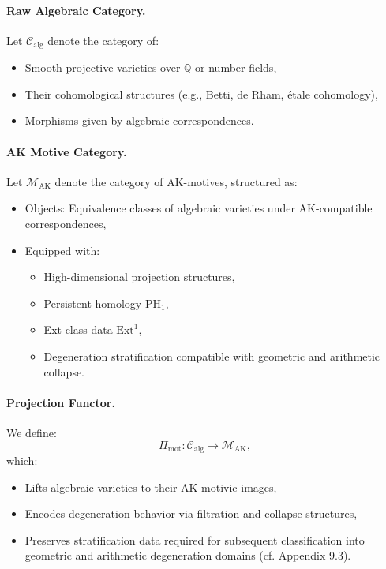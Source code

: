 \documentclass[11pt]{article}
\begin{document}
\paragraph{Raw Algebraic Category.}
Let \( \mathcal{C}_{\mathrm{alg}} \) denote the category of:
\begin{itemize}
  \item Smooth projective varieties over \( \mathbb{Q} \) or number fields,
  \item Their cohomological structures (e.g., Betti, de Rham, étale cohomology),
  \item Morphisms given by algebraic correspondences.
\end{itemize}

\paragraph{AK Motive Category.}
Let \( \mathcal{M}_{\mathrm{AK}} \) denote the category of AK-motives, structured as:
\begin{itemize}
  \item Objects: Equivalence classes of algebraic varieties under AK-compatible correspondences,
  \item Equipped with:
  \begin{itemize}
    \item High-dimensional projection structures,
    \item Persistent homology \( \mathrm{PH}_1 \),
    \item Ext-class data \( \mathrm{Ext}^1 \),
    \item Degeneration stratification compatible with geometric and arithmetic collapse.
  \end{itemize}
\end{itemize}

\paragraph{Projection Functor.}
We define:
\[
\Pi_{\mathrm{mot}} : \mathcal{C}_{\mathrm{alg}} \longrightarrow \mathcal{M}_{\mathrm{AK}},
\]
which:
\begin{itemize}
  \item Lifts algebraic varieties to their AK-motivic images,
  \item Encodes degeneration behavior via filtration and collapse structures,
  \item Preserves stratification data required for subsequent classification into geometric and arithmetic degeneration domains (cf. Appendix 9.3).
\end{itemize}
\end{document}
